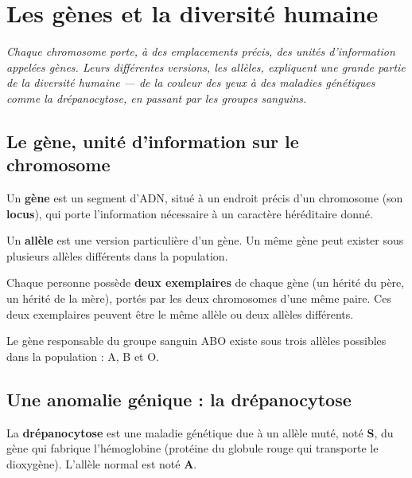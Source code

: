 \chapter{Les gènes et la diversité humaine}

\noindent\textit{Chaque chromosome porte, à des emplacements précis, des unités
d'information appelées gènes. Leurs différentes versions, les allèles, expliquent une
grande partie de la diversité humaine — de la couleur des yeux à des maladies
génétiques comme la drépanocytose, en passant par les groupes sanguins.}
\vspace{8pt}

\connecteBanner

\section{Le gène, unité d'information sur le chromosome}

\begin{definition}[Gène]
Un \textbf{gène} est un segment d'ADN, situé à un endroit précis d'un chromosome (son
\textbf{locus}), qui porte l'information nécessaire à un caractère héréditaire donné.
\end{definition}

\begin{definition}[Allèle]
Un \textbf{allèle} est une version particulière d'un gène. Un même gène peut exister
sous plusieurs allèles différents dans la population.
\end{definition}

\begin{propriete}
Chaque personne possède \textbf{deux exemplaires} de chaque gène (un hérité du père, un
hérité de la mère), portés par les deux chromosomes d'une même paire. Ces deux
exemplaires peuvent être le même allèle ou deux allèles différents.
\end{propriete}

\begin{exemple}
Le gène responsable du groupe sanguin ABO existe sous trois allèles possibles dans la
population : A, B et O.
\end{exemple}

\section{Une anomalie génique : la drépanocytose}

\begin{definition}[Drépanocytose]
La \textbf{drépanocytose} est une maladie génétique due à un allèle muté, noté
\textbf{S}, du gène qui fabrique l'hémoglobine (protéine du globule rouge qui
transporte le dioxygène). L'allèle normal est noté \textbf{A}.
\end{definition}

